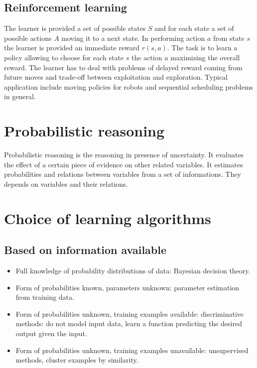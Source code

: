 	\subsection{Reinforcement learning}
	The learner is provided a set of possible states $S$ and for each state a set of possible actions $A$ moving it to a next state.
	In performing action $a$ from state $s$ the learner is provided an immediate reward $r(s,a)$.
	The task is to learn a policy allowing to choose for each state $s$ the action $a$ maximizing the overall reward.
	The learner has to deal with problems of delayed reward coming from future moves and trade-off between exploitation and exploration.
	Typical application include moving policies for robots and sequential scheduling problems in general.

\section{Probabilistic reasoning}
Probabilistic reasoning is the reasoning in presence of uncertainty.
It evaluates the effect of a certain piece of evidence on other related variables.
It estimates probabilities and relations between variables from a set of informations.
They depends on variables and their relations.

\section{Choice of learning algorithms}

	\subsection{Based on information available}
	\begin{itemize}
		\item Full knowledge of probability distributions of data: Bayesian decision theory.
		\item Form of probabilities known, parameters unknown: parameter estimation from training data.
		\item Form of probabilities unknown, training examples available: discriminative methods: do not model input data, learn a function predicting the desired output given the input.
		\item Form of probabilities unknown, training examples unavailable: unsupervised methods, cluster examples by similarity.
	\end{itemize}
